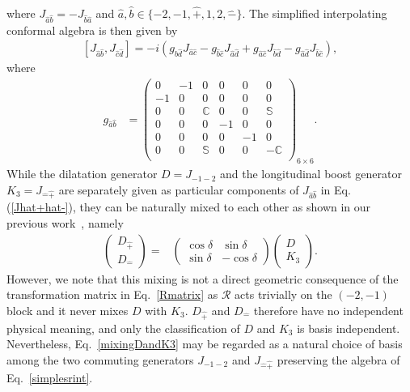 \documentclass[foundations,article,submit,pdftex,moreauthors]{Definitions/mdpi}
\begin{document}
where $J_{\hat{a}\hat{b}}=-J_{\hat{b}\hat{a}}$ and $\hat{a},\hat{b}\in\{-2,-1,\hat{+},1,2,\hat{-}\}$.  
The simplified interpolating conformal algebra is then given by
  \begin{align}
      \left[J_{{\hat{a}}{\hat{b}}},J_{{\hat{c}}{\hat{d}}}\right]=-i\left(g_{{\hat{b}}{\hat{d}}}J_{{\hat{a}}{\hat{c}}}-g_{{\hat{b}}{\hat{c}}}J_{{\hat{a}}{\hat{d}}}+g_{{\hat{a}}{\hat{c}}}J_{{\hat{b}}{\hat{d}}}-g_{{\hat{a}}{\hat{d}}}J_{{\hat{b}}{\hat{c}}}\right),
      \label{simplesrint}
  \end{align}
where
\begin{align}
    g_{\hat{a}\hat{b}}&=\begin{pmatrix}
  0&-1&0&0&0&0\\
  -1&0&0&0&0&0\\
  0&0&\mathbb{C}&0&0&\mathbb{S}\\
  0&0&0&-1&0&0\\
  0&0&0&0&-1&0\\
  0&0&\mathbb{S}&0&0&-\mathbb{C}\\
  \end{pmatrix}_{6\times6}.\label{metricghat}
\end{align}
While the dilatation generator $D = J_{-1-2}$ and the longitudinal boost generator $K_3 = J_{{\hat -}{\hat +}}$ are separately given as particular components of $J_{{\hat a}{\hat b}}$ in Eq.(\ref{Jhat+hat-}),
they can be naturally mixed to each other as shown in our previous work~\cite{Ji-Hari-2026-PRD}, namely
\begin{align}
\label{mixingDandK3}
    \begin{pmatrix}
        D_{\hat{+}}\\
        D_{\hat{-}}
    \end{pmatrix}=&\begin{pmatrix}
        \cos\delta&\sin\delta\\
        \sin\delta&-\cos\delta
    \end{pmatrix}\begin{pmatrix}
        D\\
        K_3
    \end{pmatrix}.
\end{align}
{However, we note that this mixing is not a direct geometric consequence of the transformation matrix in Eq.~\eqref{Rmatrix} as $\mathcal{R}$ acts trivially on the $(-2,-1)$ block and it never mixes $D$ with $K_3$. {\color{blue} 
$D_{\hat +}$ and $D_{\hat -}$ therefore have no independent physical meaning, and only the classification of $D$ and $K_3$ is basis independent.} 
Nevertheless, Eq.~\eqref{mixingDandK3} may be regarded as a natural choice of basis among the two commuting generators $J_{-1-2}$ and $J_{\hat{-}\hat{+}}$ preserving the algebra of Eq.~\eqref{simplesrint}.} 
\end{document}
